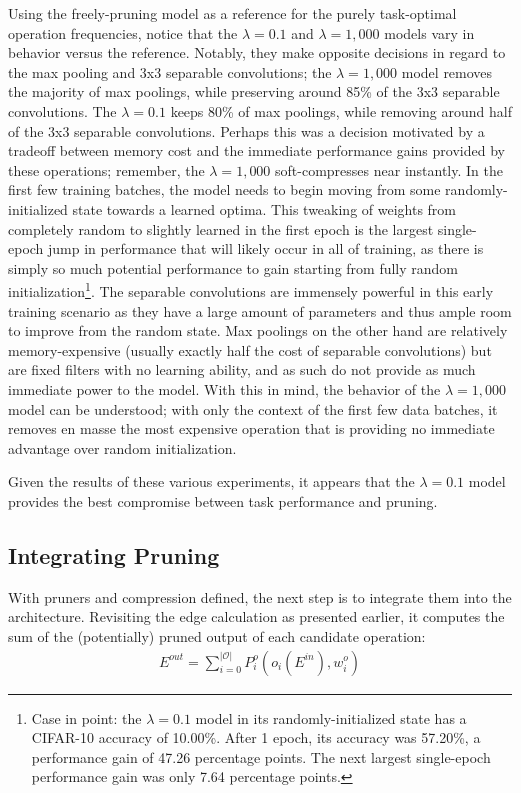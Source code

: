 Using the freely-pruning model as a reference for the purely task-optimal operation frequencies, notice that
	the $\lambda=0.1$ and $\lambda=1,000$ models vary in behavior
versus the reference. Notably, they make opposite decisions in regard to the max pooling and 3x3 separable convolutions;
the $\lambda=1,000$ model removes the majority of max poolings,
while preserving around 85\% of the 3x3 separable convolutions. The $\lambda=0.1$ keeps 80\% of max poolings, while removing
around half of the 3x3 separable convolutions. Perhaps this was a decision motivated by a tradeoff between memory cost and
the immediate performance gains provided by these operations; remember, the $\lambda=1,000$ soft-compresses near instantly.
In the first few training batches, the model needs to begin moving from some randomly-initialized state towards
a learned optima. This tweaking of weights from completely random to slightly learned in the first epoch is
the largest single-epoch jump in performance that will likely occur in all of training, as there is simply so much
potential performance to gain starting from fully random initialization\footnote{Case in point: the $\lambda=0.1$ model
in its randomly-initialized state has a CIFAR-10 accuracy of 10.00\%. After 1 epoch, its accuracy was 57.20\%, a performance
gain of 47.26 percentage points. The next largest single-epoch performance gain was only 7.64 percentage points.}. The
separable convolutions are immensely powerful in this early training scenario as they have a large amount of
parameters and thus ample room to improve from the random state. Max poolings on the other hand are relatively
memory-expensive (usually exactly half the cost of separable convolutions) but are fixed filters with no learning ability,
and as such do not provide as much immediate power to the model. With this in mind, the behavior of the
$\lambda=1,000$ model can be understood; with only the context of the first few data batches, it removes en masse
the most expensive operation that is providing no immediate advantage over random initialization.

Given the results of these various experiments, it appears that the $\lambda=0.1$ model provides the best compromise between
task performance and pruning.

\subsection{Integrating Pruning} \label{sect:pruner_batchnorm}
With pruners and compression defined, the next step is to integrate them into the architecture. Revisiting the
edge calculation as presented earlier, it computes the sum of the (potentially) pruned output of each candidate
operation:
\begin{align}
	E^{out} = \sum_{i=0}^{\mathcal{|O|}} P^o_i (o_i(E^{in}), w^o_i) \label{eq:candidate_pruner_sum}
\end{align}

